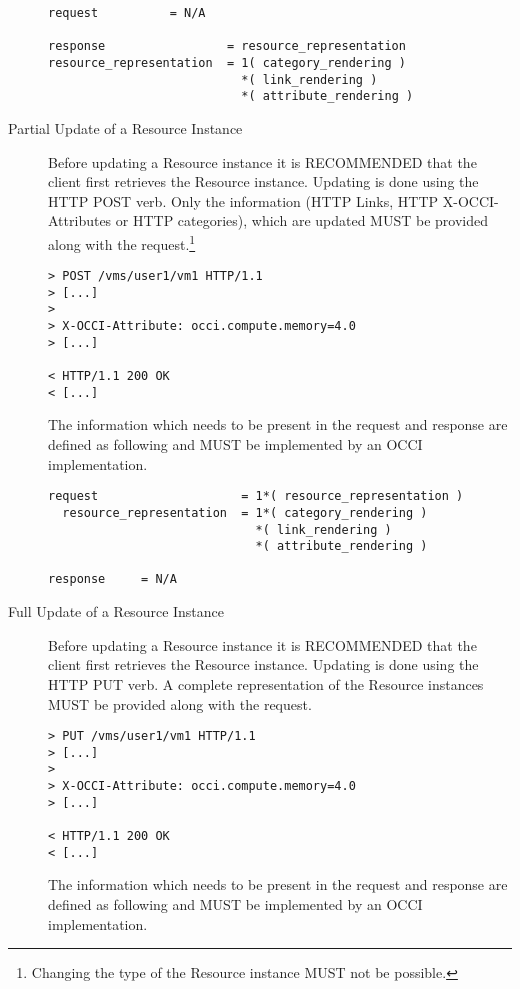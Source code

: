\documentclass[10pt,a4paper]{article}
\begin{document}
\begin{description}
\begin{verbatim}
request          = N/A

response                 = resource_representation
resource_representation  = 1( category_rendering )
                           *( link_rendering )
                           *( attribute_rendering )
\end{verbatim}

  \item[Partial Update of a Resource Instance] Before updating a
    Resource instance it is RECOMMENDED that the client first
    retrieves the Resource instance. Updating is done using the HTTP
    POST verb. Only the information (HTTP Links, HTTP
    X-OCCI-Attributes or HTTP categories), which are updated MUST be
    provided along with the request.\footnote{Changing the type of the
      Resource instance MUST not be possible.}

\begin{verbatim}
> POST /vms/user1/vm1 HTTP/1.1
> [...]
> 
> X-OCCI-Attribute: occi.compute.memory=4.0
> [...]
 
< HTTP/1.1 200 OK
< [...]
\end{verbatim}

    The information which needs to be present in the request and
    response are defined as following and MUST be implemented by an
    OCCI implementation.

\begin{verbatim}
request                    = 1*( resource_representation )
  resource_representation  = 1*( category_rendering )
                             *( link_rendering )
                             *( attribute_rendering )

response     = N/A
\end{verbatim}

  \item[Full Update of a Resource Instance] Before updating a Resource
    instance it is RECOMMENDED that the client first retrieves the
    Resource instance. Updating is done using the HTTP PUT verb. A
    complete representation of the Resource instances MUST be provided
    along with the request.

\begin{verbatim}
> PUT /vms/user1/vm1 HTTP/1.1
> [...]
> 
> X-OCCI-Attribute: occi.compute.memory=4.0
> [...]
 
< HTTP/1.1 200 OK
< [...]
\end{verbatim}

    The information which needs to be present in the request and
    response are defined as following and MUST be implemented by an
    OCCI implementation.


\end{description}
\end{document}
